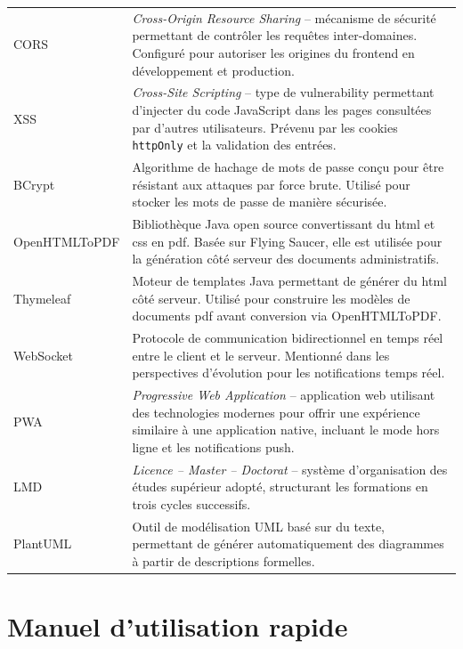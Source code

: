 \begin{xltabular}{\textwidth}{lX}
    CORS & \textit{Cross-Origin Resource Sharing} -- mécanisme de sécurité permettant de contrôler les requêtes inter-domaines. Configuré pour autoriser les origines du frontend en développement et production. \\
    XSS & \textit{Cross-Site Scripting} -- type de vulnerability permettant d'injecter du code JavaScript dans les pages consultées par d'autres utilisateurs. Prévenu par les cookies \texttt{httpOnly} et la validation des entrées. \\
    BCrypt & Algorithme de hachage de mots de passe conçu pour être résistant aux attaques par force brute. Utilisé pour stocker les mots de passe de manière sécurisée. \\
    OpenHTMLToPDF & Bibliothèque Java open source convertissant du \acrshort{html} et \acrshort{css} en \acrshort{pdf}. Basée sur Flying Saucer, elle est utilisée pour la génération côté serveur des documents administratifs. \\
    Thymeleaf & Moteur de templates Java permettant de générer du \acrshort{html} côté serveur. Utilisé pour construire les modèles de documents \acrshort{pdf} avant conversion via OpenHTMLToPDF. \\
    WebSocket & Protocole de communication bidirectionnel en temps réel entre le client et le serveur. Mentionné dans les perspectives d'évolution pour les notifications temps réel. \\
    PWA & \textit{Progressive Web Application} -- application web utilisant des technologies modernes pour offrir une expérience similaire à une application native, incluant le mode hors ligne et les notifications push. \\
    LMD & \textit{Licence -- Master -- Doctorat} -- système d'organisation des études supérieur adopté, structurant les formations en trois cycles successifs. \\
    PlantUML & Outil de modélisation UML basé sur du texte, permettant de générer automatiquement des diagrammes à partir de descriptions formelles. \\

    \bottomrule
\end{xltabular}

\newpage
\section{Manuel d'utilisation rapide}
\label{annex:manuel}

